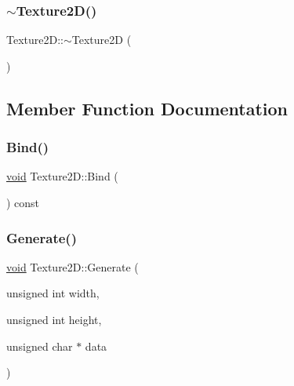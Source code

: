 \mbox{\label{classTexture2D_a84210f27b55799a096b8abc36380a077}} 
\subsubsection{\texorpdfstring{$\sim$\+Texture2\+D()}{~Texture2D()}}
{\footnotesize\ttfamily Texture2\+D\+::$\sim$\+Texture2D (\begin{DoxyParamCaption}{ }\end{DoxyParamCaption})\hspace{0.3cm}{\ttfamily [inline]}}



\subsection{Member Function Documentation}
\mbox{\label{classTexture2D_a97cc1e27512b8f520a59473e6657d7d9}} 
\subsubsection{\texorpdfstring{Bind()}{Bind()}}
{\footnotesize\ttfamily \hyperlink{imgui__impl__opengl3__loader_8h_ac668e7cffd9e2e9cfee428b9b2f34fa7}{void} Texture2\+D\+::\+Bind (\begin{DoxyParamCaption}{ }\end{DoxyParamCaption}) const}

\mbox{\label{classTexture2D_a29768bc9e468322d8b6b86374890c2cc}} 
\subsubsection{\texorpdfstring{Generate()}{Generate()}}
{\footnotesize\ttfamily \hyperlink{imgui__impl__opengl3__loader_8h_ac668e7cffd9e2e9cfee428b9b2f34fa7}{void} Texture2\+D\+::\+Generate (\begin{DoxyParamCaption}\item[{unsigned int}]{width,  }\item[{unsigned int}]{height,  }\item[{unsigned char $\ast$}]{data }\end{DoxyParamCaption})}



